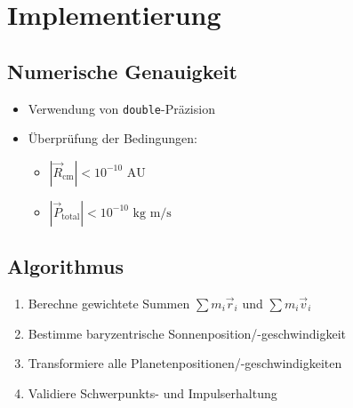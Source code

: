 \section{Implementierung}
\subsection{Numerische Genauigkeit}
\begin{itemize}
\item Verwendung von \texttt{double}-Präzision
\item Überprüfung der Bedingungen:
\begin{itemize}
\item $|\vec{R}_{\text{cm}}| < 10^{-10} \text{ AU}$
\item $|\vec{P}_{\text{total}}| < 10^{-10} \text{ kg m/s}$
\end{itemize}
\end{itemize}

\subsection{Algorithmus}
\begin{enumerate}
\item Berechne gewichtete Summen $\sum m_i\vec{r}_i$ und $\sum m_i\vec{v}_i$
\item Bestimme baryzentrische Sonnenposition/-geschwindigkeit
\item Transformiere alle Planetenpositionen/-geschwindigkeiten
\item Validiere Schwerpunkts- und Impulserhaltung
\end{enumerate}